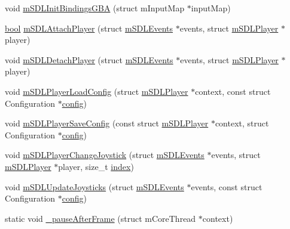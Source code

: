 \begin{DoxyCompactItemize}
\item 
void \mbox{\hyperlink{sdl-events_8c_a254830bd4cde57bec6bf2dade355902f}{m\+S\+D\+L\+Init\+Bindings\+G\+BA}} (struct m\+Input\+Map $\ast$input\+Map)
\item 
\mbox{\hyperlink{libretro_8h_a4a26dcae73fb7e1528214a068aca317e}{bool}} \mbox{\hyperlink{sdl-events_8c_acddd18a03f8a08870ffb4e369814425f}{m\+S\+D\+L\+Attach\+Player}} (struct \mbox{\hyperlink{sdl-events_8h_structm_s_d_l_events}{m\+S\+D\+L\+Events}} $\ast$events, struct \mbox{\hyperlink{sdl-events_8h_structm_s_d_l_player}{m\+S\+D\+L\+Player}} $\ast$player)
\item 
void \mbox{\hyperlink{sdl-events_8c_a64e440a5ad2a51018e3fe003e1b2615e}{m\+S\+D\+L\+Detach\+Player}} (struct \mbox{\hyperlink{sdl-events_8h_structm_s_d_l_events}{m\+S\+D\+L\+Events}} $\ast$events, struct \mbox{\hyperlink{sdl-events_8h_structm_s_d_l_player}{m\+S\+D\+L\+Player}} $\ast$player)
\item 
void \mbox{\hyperlink{sdl-events_8c_a2e6e0f34192ea8c75aaa522b1cd8ccf6}{m\+S\+D\+L\+Player\+Load\+Config}} (struct \mbox{\hyperlink{sdl-events_8h_structm_s_d_l_player}{m\+S\+D\+L\+Player}} $\ast$context, const struct Configuration $\ast$\mbox{\hyperlink{deflate_8c_a4473b5227787415097004fd39f55185e}{config}})
\item 
void \mbox{\hyperlink{sdl-events_8c_a337054256f6cb4160128bdfe03bfe3e1}{m\+S\+D\+L\+Player\+Save\+Config}} (const struct \mbox{\hyperlink{sdl-events_8h_structm_s_d_l_player}{m\+S\+D\+L\+Player}} $\ast$context, struct Configuration $\ast$\mbox{\hyperlink{deflate_8c_a4473b5227787415097004fd39f55185e}{config}})
\item 
void \mbox{\hyperlink{sdl-events_8c_aed738247356e33dc5bf0ba5cff942a42}{m\+S\+D\+L\+Player\+Change\+Joystick}} (struct \mbox{\hyperlink{sdl-events_8h_structm_s_d_l_events}{m\+S\+D\+L\+Events}} $\ast$events, struct \mbox{\hyperlink{sdl-events_8h_structm_s_d_l_player}{m\+S\+D\+L\+Player}} $\ast$player, size\+\_\+t \mbox{\hyperlink{isa-lr35902_8c_ac9ee548085af12859cb52a6c757cf73a}{index}})
\item 
void \mbox{\hyperlink{sdl-events_8c_aff18d01c9bc92cc366bd2dd53984420a}{m\+S\+D\+L\+Update\+Joysticks}} (struct \mbox{\hyperlink{sdl-events_8h_structm_s_d_l_events}{m\+S\+D\+L\+Events}} $\ast$events, const struct Configuration $\ast$\mbox{\hyperlink{deflate_8c_a4473b5227787415097004fd39f55185e}{config}})
\item 
static void \mbox{\hyperlink{sdl-events_8c_a9975fd4e100657c0625df03e039dba9d}{\+\_\+pause\+After\+Frame}} (struct m\+Core\+Thread $\ast$context)

\end{DoxyCompactItemize}
